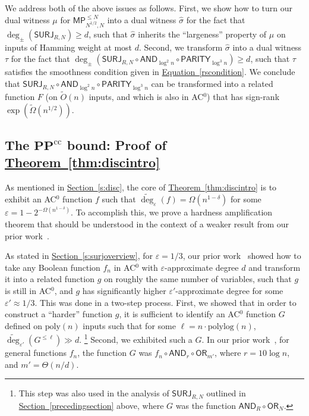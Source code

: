 \documentclass[11pt]{article}
\numberwithin{equation}{section}
\theoremstyle{definition}
\theoremstyle{plain}
\newcommand{\expref}[2]{\hyperref[#2]{#1~\ref{#2}}}
\newcommand{\expeqref}[2]{\hyperref[#2]{#1~\eqref{#2}}}
\newcommand{\poly}{\mathrm{poly}}
\newcommand{\polylog}{\mathrm{polylog}}
\newcommand{\SURJ}{\mathsf{ SURJ}}
\newcommand{\OR}{\mathsf{ OR}}
\newcommand{\PPcc}{\mathbf{PP}^{\text{cc}}}
\newcommand{\eps}{\varepsilon}
\newcommand{\adeg}{\widetilde{\operatorname{deg}}}
\newcommand{\AND}{\mathsf{AND}}
\newcommand{\PARITY}{\mathsf{PARITY}}
\begin{document}
We address both of the above issues as follows. First, we show how to turn our dual witness $\mu$ for $\mathsf{MP}_{N^{1/2}, N}^{\leq N}$
into a dual witness $\hat{\sigma}$
for the fact that $\deg_{\pm}\left(\SURJ_{R, N}\right)\geq d$, such that $\hat{\sigma}$ inherits the ``largeness'' property of $\mu$ on inputs of Hamming weight at most $d$. 
Second, we transform $\hat{\sigma}$ into a dual witness $\tau$ for the fact that $\deg_{\pm}\left(\SURJ_{R, N} \circ \AND_{\log^2 n} \circ \PARITY_{\log^3 n}\right)\geq d$, such
that $\tau$ satisfies the smoothness condition given in \expeqref{Equation}{rscondition}. 
We conclude that $\SURJ_{R, N} \circ \AND_{\log^2 n} \circ \PARITY_{\log^3 n}$ can be transformed into
a related function $F$ (on $\tilde{O}(n)$ inputs, and which is also in AC$^0$) that has sign-rank $\exp(\tilde{\Omega}(n^{1/2}))$.

\label{precedingsection}
\subsection{The \texorpdfstring{$\PPcc$}{PPcc} bound: 
Proof of \expref{Theorem}{thm:discintro}}
\label{s:hardnessamps}
As mentioned in \expref{Section}{s:disc}, the core of \expref{Theorem}{thm:discintro} is to exhibit an
AC$^0$ function $f$ such that $\adeg_{\eps}(f) = \Omega(n^{1-\delta})$
for some $\eps= 1-2^{-\Omega(n^{1-\delta})}$. To accomplish this, we prove a hardness
amplification theorem that should be understood in the context of a weaker result from our prior work~\cite{adegsurj}.

As stated in \expref{Section}{s:surjoverview}, for $\eps=1/3$, our prior work~\cite{adegsurj} showed how to take any Boolean function $f_n$ in AC$^0$ 
with $\eps$-approximate degree $d$ and transform it into a related function $g$ on roughly the same number of variables, such that $g$ is still in AC$^0$, and $g$ has significantly higher $\eps'$-approximate degree for some $\eps' \approx 1/3$. %
This was done in a two-step process. First, we showed
that in order to construct a ``harder'' function $g$, it is sufficient to identify an AC$^0$ function $G$ defined on $\poly(n)$ inputs
such that for some $\ell=n\cdot\polylog(n)$, $\adeg_{\eps'}(G^{\leq \ell}) \gg d$.
\footnote{This step was also
	used in the analysis of $\SURJ_{R, N}$ outlined in \expref{Section}{precedingsection} above, where $G$ was the function $\AND_R \circ \OR_N$.} 
Second, we exhibited such a $G$. 
In our prior %
work~\cite{adegsurj, bkt}, for general functions $f_n$, 
the function $G$ was $f_n \circ \AND_r \circ \OR_{m'}$, where $r=10 \log n$, and $m'=\Theta(n/d)$. 
\end{document}
